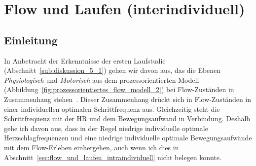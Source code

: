 

\section{Flow und Laufen (interindividuell)} 

\label{sec:flow_und_laufen_interindividuell}

\subsection{Einleitung} 

\label{sub:einleitung_5_3}

In Anbetracht der Erkenntnisse der ersten Laufstudie (Abschnitt~\ref{sub:diskussion_5_1}) gehen wir davon aus, das die Ebenen \emph{Physiologisch} und \emph{Motorisch} aus dem prozessorientierten Modell (Abbildung~\ref{fig:prozessorientiertes_flow_modell_2}) bei Flow-Zuständen in Zusammenhang stehen~\citep{Grueter2016a}. Dieser Zusammenhang drückt sich in Flow-Zuständen in einer individuellen optimalen Schrittfrequenz aus. Gleichzeitig steht die Schrittfrequenz mit der \ac{HR} und dem Bewegungsaufwand in Verbindung. Deshalb gehe ich davon aus, dass in der Regel niedrige individuelle optimale Herzschlagfrequenzen und eine niedrige individuelle optimale Bewegungsaufwände mit dem Flow-Erleben einhergehen, auch wenn ich dies in Abschnitt~\ref{sec:flow_und_laufen_intraindividuell} nicht belegen konnte. 

